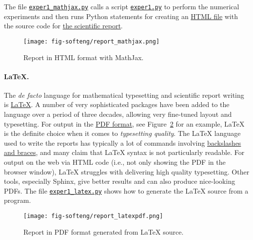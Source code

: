 \documentclass[graybox,sectrefs,envcountresetchap,open=right,final]{svmonodo}
\begin{document}
The file \href{{http://tinyurl.com/p96acy2/report_generation/exper1_html.py}}{\nolinkurl{exper1_mathjax.py}}
calls a script
\href{{http://tinyurl.com/p96acy2/exper1.py}}{\nolinkurl{exper1.py}}
to perform the numerical experiments and then runs Python
statements for creating an \href{{http://tinyurl.com/nc4upel/_static/report_mathjax.html.html}}{HTML file} with the source code for \href{{http://tinyurl.com/nc4upel/_static/report_mathjax.html}}{the scientific report}.


\begin{figure}[!ht]  %
  \centerline{\texttt{[image: fig-softeng/report\_mathjax.png]}}
  \caption{
  Report in HTML format with MathJax. \label{softeng1:exper:report:fig:mathjax}
  }
\end{figure}



\paragraph{{\LaTeX}.}

The \emph{de facto} language for mathematical typesetting and scientific
report writing is \href{{http://en.wikipedia.org/wiki/LaTeX}}{LaTeX}. A
number of very sophisticated packages have been added to the language
over a period of three decades, allowing very fine-tuned layout and
typesetting. For output in the \href{{http://tinyurl.com/nc4upel/_static/report.pdf}}{PDF format}, see Figure~\ref{softeng1:exper:report:fig:latex} for an example, {\LaTeX} is the
definite choice when it comes to \emph{typesetting quality}.
The {\LaTeX} language used to
write the reports has typically a lot of commands involving
\href{{http://tinyurl.com/nc4upel/_static/report.tex.html}}{backslashes and braces}, and many claim that
{\LaTeX} syntax is not particularly readable.  For output on the web via
HTML code (i.e., not only showing the PDF in the browser window), {\LaTeX}
struggles with delivering high quality typesetting. Other tools,
especially Sphinx, give better results and can also produce
nice-looking PDFs.  The file \href{{http://tinyurl.com/p96acy2/report_generation/exper1_latex.py}}{\nolinkurl{exper1_latex.py}} shows how to
generate the {\LaTeX} source from a program.


\begin{figure}[!ht]  %
  \centerline{\texttt{[image: fig-softeng/report\_latexpdf.png]}}
  \caption{
  Report in PDF format generated from {\LaTeX} source. \label{softeng1:exper:report:fig:latex}
  }
\end{figure}
\end{document}
